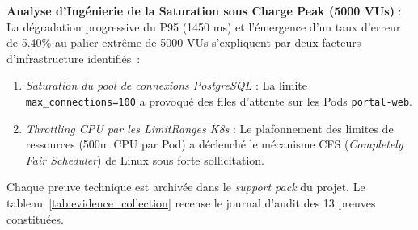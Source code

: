 \textbf{Analyse d'Ingénierie de la Saturation sous Charge Peak (5000 VUs)} : La dégradation progressive du P95 (1450 ms) et l'émergence d'un taux d'erreur de 5.40\% au palier extrême de 5000 VUs s'expliquent par deux facteurs d'infrastructure identifiés~:
\begin{enumerate}
    \item \textit{Saturation du pool de connexions PostgreSQL} : La limite \texttt{max\_connections=100} a provoqué des files d'attente sur les Pods \texttt{portal-web}.
    \item \textit{Throttling CPU par les LimitRanges K8s} : Le plafonnement des limites de ressources (500m CPU par Pod) a déclenché le mécanisme CFS (\textit{Completely Fair Scheduler}) de Linux sous forte sollicitation.
\end{enumerate}

\vspace{0.3cm}
Chaque preuve technique est archivée dans le \textit{support pack} du projet. Le tableau~\ref{tab:evidence_collection} recense le journal d'audit des 13 preuves constituées.

